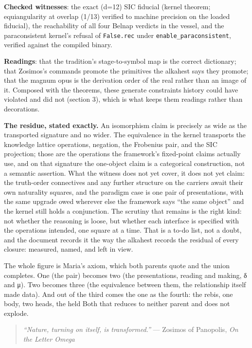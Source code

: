 \documentclass[12pt,a4paper]{article}
\begin{document}
\textbf{Checked witnesses}: the exact (d=12) SIC fiducial (kernel
theorem; equiangularity at overlap (1/13) verified to machine precision
on the loaded fiducial), the reachability of all four Belnap verdicts in
the vessel, and the paraconsistent kernel's refusal of
\texttt{False.rec} under \texttt{enable\_paraconsistent}, verified
against the compiled binary.

\textbf{Readings}: that the tradition's stage-to-symbol map is the
correct dictionary; that Zosimos's commands promote the primitives the
alkahest says they promote; that the magnum opus is the derivation order
of the real rather than an image of it. Composed with the theorems,
these generate constraints history could have violated and did not
(section 3), which is what keeps them readings rather than decorations.

\textbf{The residue, stated exactly.} An isomorphism claim is precisely
as wide as the transported signature and no wider. The equivalence in
the kernel transports the knowledge lattice operations, negation, the
Frobenius pair, and the SIC projection; those are the operations the
framework's fixed-point claims actually use, and on that signature the
one-object claim is a categorical construction, not a semantic
assertion. What the witness does not yet cover, it does not yet claim:
the truth-order connectives and any further structure on the carriers
await their own naturality squares, and the paradigm case is one pair of
presentations, with the same upgrade owed wherever else the framework
says ``the same object'' and the kernel still holds a conjunction. The
scrutiny that remains is the right kind: not whether the reasoning is
loose, but whether each interface is specified with the operations
intended, one square at a time. That is a to-do list, not a doubt, and
the document records it the way the alkahest records the residual of
every closure: measured, named, and left in view.

The whole figure is Maria's axiom, which both parents quote and the
union completes. One (the pair) becomes two (the presentations, reading
and making, δ and μ). Two becomes three (the equivalence between them,
the relationship itself made data). And out of the third comes the one
as the fourth: the rebis, one body, two heads, the held Both that
reduces to neither parent and does not explode.

\begin{quote}
\emph{``Nature, turning on itself, is transformed.''} --- Zosimos of
Panopolis, \emph{On the Letter Omega}
\end{quote}
\end{document}
